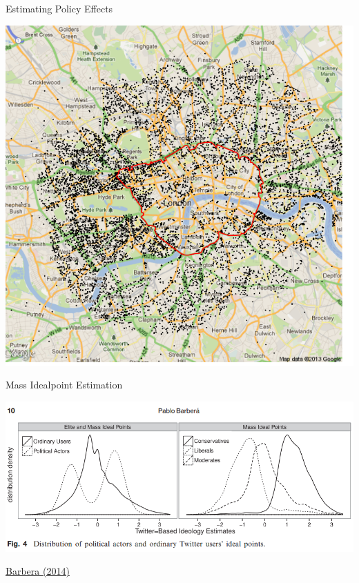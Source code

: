 \documentclass[ignorenonframetext,]{beamer}
\begin{document}
\begin{frame}{Estimating Policy Effects}

\includegraphics{fig/policyeffects.png}

\end{frame}

\begin{frame}{Mass Idealpoint Estimation}

\includegraphics{fig/barbera.png}

\href{http://pan.oxfordjournals.org/content/early/2014/09/11/pan.mpu011.full.pdf+html}{Barbera
(2014)}

\end{frame}
\end{document}
